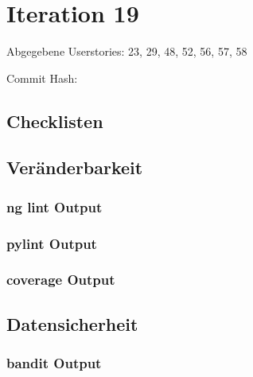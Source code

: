 \section{Iteration 19}
	Abgegebene Userstories: 23, 29, 48, 52, 56, 57, 58
	
	Commit Hash: 
	
	\subsection{Checklisten}
	
	
	
	
	

	\subsection{Veränderbarkeit}
	\subsubsection{ng lint Output}
	

	\subsubsection{pylint Output}
	

	\subsubsection{coverage Output}
	

	\subsection{Datensicherheit}

	\subsubsection{bandit Output}
	
